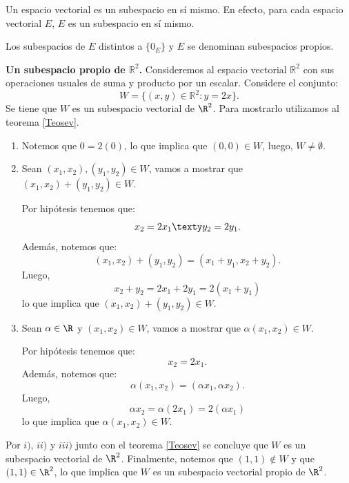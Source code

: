 \documentclass[compacto,10pt]{pubciencias-notas}
\begin{document}
\begin{ejem}\hspace{0pt} Un espacio vectorial es un subespacio en sí mismo. En efecto, para cada espacio vectorial $E$, $E$ es un subespacio en sí mismo.
\end{ejem}

\begin{obs}
Los subespacios de $E$ distintos a $\{0_{E}\}$ y $E$ se denominan subespacios propios. 
\end{obs}

\begin{ejem}\label{Ejsev}\hspace{0pt} \textbf{Un subespacio propio de $\mathbb{R}^{2}$.} Consideremos al espacio vectorial $\mathbb{R}^{2}$ con sus operaciones usuales de suma y producto por un escalar. Considere el conjunto:
\[
    W= \{(x,y)\in \mathbb{R}^{2} : y=2x \}.
\]
Se tiene que $W$ es un subespacio vectorial de $\R^{2}$. Para mostrarlo utilizamos al teorema \ref{Teosev}.
\begin{enumerate}
\item[$i)$] Notemos que $0 = 2(0)$, lo que implica que $(0,0)\in W$, luego, $W\neq\emptyset$.
\item[$ii)$] Sean $(x_{1},x_{2}), (y_{1}, y_{2})\in W$, vamos a mostrar que $(x_{1},x_{2}) + (y_{1}, y_{2})\in W$.

Por hipótesis tenemos que: 
\[
    x_{2} = 2x_{1} \texty y_{2} = 2y_{1}.
\]
Además, notemos que:
\[
    (x_{1},x_{2}) + (y_{1}, y_{2}) = (x_{1} + y_{1}, x_{2} + y_{2}).
\]
Luego, 
\[
    x_{2} + y_{2} = 2x_{1} + 2y_{1} = 2(x_{1} + y_{1})
\]
lo que implica que $(x_{1},x_{2})+(y_{1}, y_{2})\in W$.
\item[$iii)$] Sean $\alpha\in\R$ y $(x_{1},x_{2})\in W$, vamos a mostrar que $\alpha(x_{1},x_{2})\in W$.

Por hipótesis tenemos que: 
\[
    x_{2} = 2x_{1}.
\]
Además, notemos que: 
\[
    \alpha(x_{1},x_{2}) = (\alpha x_{1}, \alpha x_{2}).
\]
Luego, 
\[
    \alpha x_{2}  = \alpha(2x_{1}) = 2(\alpha x_{1})
\]
lo que implica que $\alpha (x_{1},x_{2})\in W$.
\end{enumerate}
Por $i)$, $ii)$ y $iii)$ junto con el teorema \ref{Teosev} se concluye que $W$ es un subespacio vectorial de $\R^{2}$. Finalmente, notemos que $(1,1)\notin W$ y que $(1,1)\in\R^{2}$, lo que implica que $W$ es un subespacio vectorial propio de $\R^{2}$.

\end{ejem}
\end{document}
